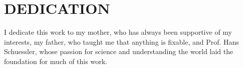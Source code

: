 %
%
%
%
%

\chapter*{DEDICATION}



\begin{center}
    \vspace*{\fill}
    I dedicate this work to my mother, who has always been supportive of my interests, my father, who taught me that anything is fixable, and Prof. Hans Schuessler, whose passion for science and understanding the world laid the foundation for much of this work.
    \vspace*{\fill}
\end{center}

\pagebreak{}
